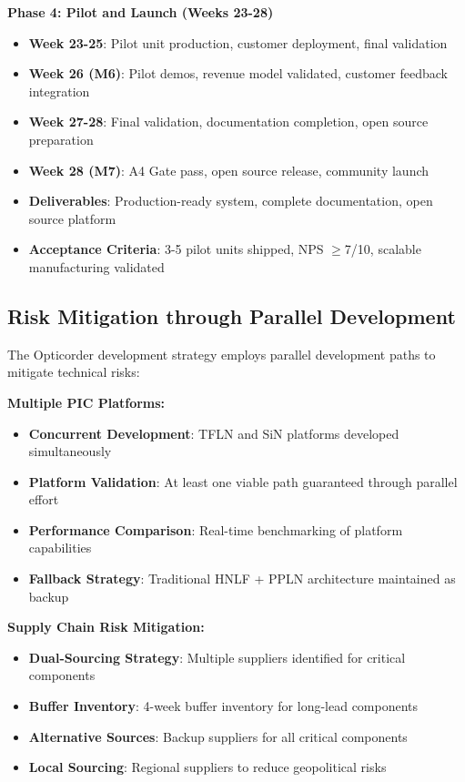 \documentclass[11pt,a4paper]{article}
\begin{document}
\textbf{Phase 4: Pilot and Launch (Weeks 23-28)}
\begin{itemize}
\item \textbf{Week 23-25}: Pilot unit production, customer deployment, final validation
\item \textbf{Week 26 (M6)}: Pilot demos, revenue model validated, customer feedback integration
\item \textbf{Week 27-28}: Final validation, documentation completion, open source preparation
\item \textbf{Week 28 (M7)}: A4 Gate pass, open source release, community launch
\item \textbf{Deliverables}: Production-ready system, complete documentation, open source platform
\item \textbf{Acceptance Criteria}: 3-5 pilot units shipped, NPS $\geq$7/10, scalable manufacturing validated
\end{itemize}

\subsection{Risk Mitigation through Parallel Development}
The Opticorder development strategy employs parallel development paths to mitigate technical risks:

\textbf{Multiple PIC Platforms:}
\begin{itemize}
\item \textbf{Concurrent Development}: TFLN and SiN platforms developed simultaneously
\item \textbf{Platform Validation}: At least one viable path guaranteed through parallel effort
\item \textbf{Performance Comparison}: Real-time benchmarking of platform capabilities
\item \textbf{Fallback Strategy}: Traditional HNLF + PPLN architecture maintained as backup
\end{itemize}

\textbf{Supply Chain Risk Mitigation:}
\begin{itemize}
\item \textbf{Dual-Sourcing Strategy}: Multiple suppliers identified for critical components
\item \textbf{Buffer Inventory}: 4-week buffer inventory for long-lead components
\item \textbf{Alternative Sources}: Backup suppliers for all critical components
\item \textbf{Local Sourcing}: Regional suppliers to reduce geopolitical risks
\end{itemize}
\end{document}
